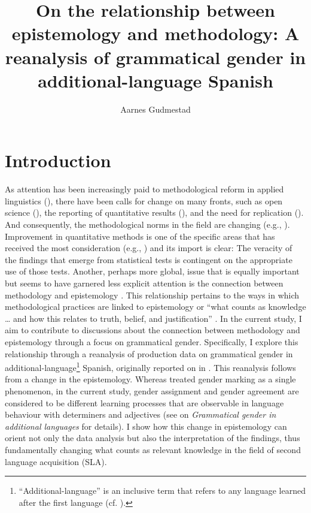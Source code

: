\documentclass[output=paper,colorlinks,citecolor=brown,modfonts,nonflat]{../langscibook}
\author{Aarnes Gudmestad\affiliation{Virginia Polytechnic Institute and State University}\orcid{}}
\title{On the relationship between epistemology and methodology: 
A reanalysis of grammatical gender in additional-language Spanish}
\begin{document}
\maketitle 
{}

\section{Introduction}\label{sec:gudmestad:1}

As attention has been increasingly paid to methodological reform in applied linguistics (\citealt{Byrnes2013,PhakitiEtAl2018}), there have been calls for change on many fronts, such as open science (\citealt{MarsdenPlonsky2018}), the reporting of quantitative results (\citealt{Larsen-HallPlonsky2015}), and the need for replication (\citealt{PorteMcManus2018}). And consequently, the methodological norms in the field are changing (e.g., \citealt{MarsdenEtAl2018Reports}). Improvement in quantitative methods is one of the specific areas that has received the most consideration (e.g., \citealt{Plonsky2015}) and its import is clear: The veracity of the findings that emerge from statistical tests is contingent on the appropriate use of those tests. Another, perhaps more global, issue that is equally important but seems to have garnered less explicit attention is the connection between methodology and epistemology \citep{Ortega2005}. This relationship pertains to the ways in which methodological practices are linked to epistemology or “what counts as knowledge … and how this relates to truth, belief, and justification” \citep[40]{Young2018}. In the current study, I aim to contribute to discussions about the connection between methodology and epistemology through a focus on grammatical gender. Specifically, I explore this relationship through a reanalysis of production data on grammatical gender in additional-language\footnote{{``Additional-language'' is an inclusive term that refers to any language learned after the first language (cf. \citealt{TheDouglasFirGroup2016}).}} Spanish, originally reported on in \citet{GudmestadEtAl2019}. This reanalysis follows from a change in the epistemology. Whereas \citeauthor{GudmestadEtAl2019} treated gender marking as a single phenomenon, in the current study, gender assignment and gender agreement are considered to be different learning processes that are observable in language behaviour with determiners and adjectives (see  on \textit{Grammatical gender in additional languages} for details). I show how this change in epistemology can orient not only the data analysis but also the interpretation of the findings, thus fundamentally changing what counts as relevant knowledge in the field of second language acquisition (SLA).
\end{document}
